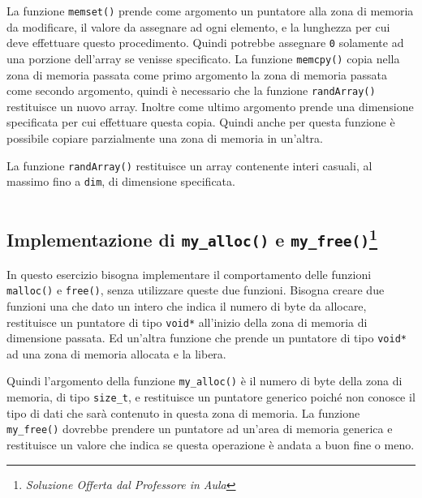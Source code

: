 \documentclass{article}
\numberwithin{equation}{subsection}
\begin{document}
\inputminted[firstline=1, lastline=5]{c}{./Esercitazione del 19-11-24/domanda3.c}
\inputminted[firstline=30, lastline=39]{c}{./Esercitazione del 19-11-24/domanda3.c}

La funzione \verb|memset()| prende come argomento un puntatore alla zona di memoria da 
modificare, il valore da assegnare ad ogni elemento, e la lunghezza per cui deve 
effettuare questo procedimento. Quindi potrebbe assegnare \verb|0| solamente ad una 
porzione dell'array se venisse specificato. La funzione \verb|memcpy()| copia nella 
zona di memoria passata come primo argomento la zona di memoria passata come 
secondo argomento, quindi è necessario che la funzione \verb|randArray()| restituisce un nuovo array. Inoltre come ultimo argomento prende una dimensione specificata per cui 
effettuare questa copia. Quindi anche per 
questa funzione è possibile copiare parzialmente una zona di memoria in un'altra. 

La funzione \verb|randArray()| restituisce un array contenente interi casuali, al massimo fino a \verb|dim|, di dimensione specificata. 
\inputminted[firstline=21, lastline=27]{c}{./Esercitazione del 19-11-24/domanda3.c}

\subsection{Implementazione di \texttt{my\_alloc()} e \texttt{my\_free()}\footnote{\textit{Soluzione Offerta dal Professore in Aula}}}

In questo esercizio bisogna implementare il comportamento delle funzioni \verb|malloc()| e \verb|free()|, 
senza utilizzare queste due funzioni. Bisogna creare due funzioni una che dato un intero che indica il numero di byte 
da allocare, restituisce un puntatore di tipo \verb|void*| all'inizio della zona di memoria di dimensione passata. Ed un'altra funzione 
che prende un puntatore di tipo \verb|void*| ad una zona di memoria allocata e la libera. 

Quindi l'argomento della funzione \verb|my_alloc()| è il numero di byte della zona di memoria, di tipo \verb|size_t|, e 
restituisce un puntatore generico poiché non conosce il tipo di dati che sarà contenuto in questa 
zona di memoria. La funzione \verb|my_free()| dovrebbe prendere un puntatore ad un'area di memoria 
generica e restituisce un valore che indica se questa operazione è andata a buon fine o meno. 
\end{document}
